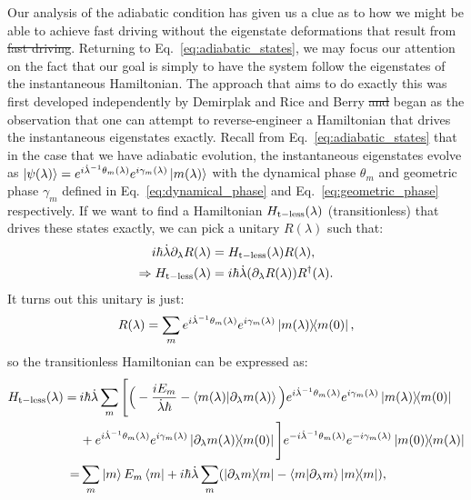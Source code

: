 \documentclass[a4paper,oneside,11pt]{book}
\newcommand{\dlambda}{\partial_{\lambda}}
\newcommand{\adj}[1]{#1^{\dagger}}
\newcommand{\dotlambda}{\dot{\lambda}}
\providecommand{\DIFaddtex}[1]{{\protect\color{blue}\uwave{#1}}} %
\providecommand{\DIFdeltex}[1]{{\protect\color{red}\sout{#1}}}                      %
\providecommand{\DIFaddbegin}{} %
\providecommand{\DIFaddend}{} %
\providecommand{\DIFdelbegin}{} %
\providecommand{\DIFdelend}{} %
\providecommand{\DIFadd}[1]{\texorpdfstring{\DIFaddtex{#1}}{#1}} %
\providecommand{\DIFdel}[1]{\texorpdfstring{\DIFdeltex{#1}}{}} %
\newcommand{\DIFscaledelfig}{0.5}
\newlength{\DIFdelgraphicswidth} %
\newlength{\DIFdelgraphicsheight} %
\newcommand{\DIFaddincludegraphics}[2][]{{\color{blue}\fbox{\DIFOincludegraphics[#1]{#2}}}} %
\newcommand{\DIFdelincludegraphics}[2][]{%
\sbox{\DIFdelgraphicsbox}{\DIFOincludegraphics[#1]{#2}}%
\settoboxwidth{\DIFdelgraphicswidth}{\DIFdelgraphicsbox} %
\settoboxtotalheight{\DIFdelgraphicsheight}{\DIFdelgraphicsbox} %
\scalebox{\DIFscaledelfig}{%
\parbox[b]{\DIFdelgraphicswidth}{\usebox{\DIFdelgraphicsbox}\\[-\baselineskip] \rule{\DIFdelgraphicswidth}{0em}}\llap{\resizebox{\DIFdelgraphicswidth}{\DIFdelgraphicsheight}{%
\setlength{\unitlength}{\DIFdelgraphicswidth}%
\begin{picture}(1,1)%
\thicklines\linethickness{2pt} %
{\color[rgb]{1,0,0}\put(0,0){\framebox(1,1){}}}%
{\color[rgb]{1,0,0}\put(0,0){\line( 1,1){1}}}%
{\color[rgb]{1,0,0}\put(0,1){\line(1,-1){1}}}%
\end{picture}%
}\hspace*{3pt}}} %
} %
\DeclareRobustCommand{\DIFaddbegin}{\DIFOaddbegin \let\includegraphics\DIFaddincludegraphics} %
\DeclareRobustCommand{\DIFaddend}{\DIFOaddend \let\includegraphics\DIFOincludegraphics} %
\DeclareRobustCommand{\DIFdelbegin}{\DIFOdelbegin \let\includegraphics\DIFdelincludegraphics} %
\DeclareRobustCommand{\DIFdelend}{\DIFOaddend \let\includegraphics\DIFOincludegraphics} %
\begin{document}
    Our analysis of the adiabatic condition has given us a clue as to how we might be able to achieve fast driving without the eigenstate deformations that result from \DIFdelbegin \DIFdel{fast driving}\DIFdelend \DIFaddbegin \DIFadd{it}\DIFaddend . Returning to Eq.~\eqref{eq:adiabatic_states}, we may focus our attention on the fact that our goal is simply to have the system follow the eigenstates of the instantaneous Hamiltonian. The approach that aims to do exactly this was first developed independently by Demirplak and Rice \cite{demirplak_adiabatic_2003} and Berry \cite{berry_transitionless_2009}\DIFdelbegin \DIFdel{and }\DIFdelend \DIFaddbegin \DIFadd{. It }\DIFaddend began as the observation that one can attempt to reverse-engineer a Hamiltonian that drives the instantaneous eigenstates exactly. Recall from Eq.~\eqref{eq:adiabatic_states} that in the case that we have adiabatic evolution, the instantaneous eigenstates evolve as $\ket{\psi(\lambda)} = e^{i \dotlambda^{-1} \theta_m(\lambda)}e^{i \gamma_m(\lambda)} \ket{m(\lambda)}$ with the dynamical phase $\theta_m$ and geometric phase $\gamma_m$ defined in Eq.~\eqref{eq:dynamical_phase} and Eq.~\eqref{eq:geometric_phase} respectively. If we want to find a Hamiltonian $H_{\rm t-less} (\lambda)$ (transitionless) that drives these states exactly, we can pick a unitary $R(\lambda)$ such that:
    \begin{equation}
        \begin{aligned}
            i\hbar \dotlambda \partial_{\lambda} R(\lambda) &= H_{\rm t-less} (\lambda) R(\lambda), \\
            \Rightarrow H_{\rm t-less} (\lambda) &= i\hbar \dotlambda (\partial_{\lambda} R(\lambda)) \adj{R}(\lambda).
        \end{aligned}
    \end{equation}
    It turns out this unitary is just:
    \begin{equation}\label{eq:transitionless_unitary}
        R(\lambda) = \sum_m e^{i \dotlambda^{-1} \theta_m(\lambda)}e^{i \gamma_m(\lambda)} \dyad{m(\lambda)}{m(0)},
    \end{equation}
    so the transitionless Hamiltonian can be expressed as:
    \begin{equation}
        \begin{aligned}\label{eq:transitionless_hamiltonian}
            \begin{aligned}
                H_{\rm t-less}(\lambda) = \: &i \hbar \dotlambda \sum_m \Bigg[ \Big(- \frac{i E_m}{\dotlambda \hbar} - \braket{m(\lambda)}{\dlambda m(\lambda)}\Big) e^{i \dotlambda^{-1} \theta_m(\lambda)}e^{i \gamma_m(\lambda)} \dyad{m(\lambda)}{m(0)} \\
                &+ e^{i \dotlambda^{-1} \theta_m(\lambda)}e^{i \gamma_m(\lambda)} \dyad{\dlambda m(\lambda)}{m(0)} \Bigg] e^{-i \dotlambda^{-1} \theta_m(\lambda)}e^{-i \gamma_m(\lambda)} \dyad{m(0)}{m(\lambda)} \\
                 = &\sum_m \ket{m} E_m \bra{m} + i\hbar \dotlambda \sum_m (\dyad{\dlambda m}{m} - \braket{m}{\dlambda m} \dyad{m}),
            \end{aligned}
        \end{aligned}
    \end{equation}
\end{document}
